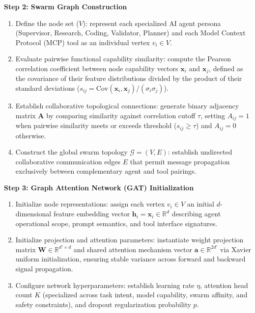 \documentclass[11pt,a4paper]{article}
\begin{document}
\textbf{Step 2: Swarm Graph Construction}
\begin{enumerate}[leftmargin=1.8em, itemsep=0.20em, topsep=0.05em]
    \item Define the node set ($V$): represent each specialized AI agent persona (Supervisor, Research, Coding, Validator, Planner) and each Model Context Protocol (MCP) tool as an individual vertex $v_i \in V$.
    \item Evaluate pairwise functional capability similarity: compute the Pearson correlation coefficient between node capability vectors $\mathbf{x}_i$ and $\mathbf{x}_j$, defined as the covariance of their feature distributions divided by the product of their standard deviations ($s_{ij} = \mathrm{Cov}(\mathbf{x}_i, \mathbf{x}_j) / (\sigma_i \sigma_j)$).
    \item Establish collaborative topological connections: generate binary adjacency matrix $\mathbf{A}$ by comparing similarity against correlation cutoff $\tau$, setting $A_{ij} = 1$ when pairwise similarity meets or exceeds threshold ($s_{ij} \ge \tau$) and $A_{ij} = 0$ otherwise.
    \item Construct the global swarm topology $\mathcal{G} = (V, E)$: establish undirected collaborative communication edges $E$ that permit message propagation exclusively between complementary agent and tool pairings.
\end{enumerate}

\vspace{0.30em}
\textbf{Step 3: Graph Attention Network (GAT) Initialization}
\begin{enumerate}[leftmargin=1.8em, itemsep=0.20em, topsep=0.05em]
    \item Initialize node representations: assign each vertex $v_i \in V$ an initial $d$-dimensional feature embedding vector $\mathbf{h}_i = \mathbf{x}_i \in \mathbb{R}^d$ describing agent operational scope, prompt semantics, and tool interface signatures.
    \item Initialize projection and attention parameters: instantiate weight projection matrix $\mathbf{W} \in \mathbb{R}^{d' \times d}$ and shared attention mechanism vector $\mathbf{a} \in \mathbb{R}^{2d'}$ via Xavier uniform initialization, ensuring stable variance across forward and backward signal propagation.
    \item Configure network hyperparameters: establish learning rate $\eta$, attention head count $K$ (specialized across task intent, model capability, swarm affinity, and safety constraints), and dropout regularization probability $p$.
\end{enumerate}
\end{document}
